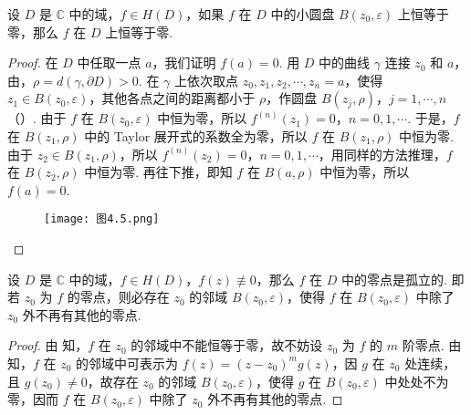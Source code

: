 \documentclass[../../main.tex]{subfiles}
\begin{document}
\begin{proposition}\label{proposition:命题4.3.5}
设 \( D \) 是 \( \mathbb{C} \) 中的域，\( f \in H(D) \)，如果 \( f \) 在 \( D \) 中的小圆盘 \( B(z_0, \varepsilon) \) 上恒等于零，那么 \( f \) 在 \( D \) 上恒等于零.
\end{proposition}
\begin{proof}
在 \( D \) 中任取一点 \( a \)，我们证明 \( f(a) = 0 \). 用 \( D \) 中的曲线 \( \gamma \) 连接 \( z_0 \) 和 \( a \)，由，\( \rho = d(\gamma, \partial D) > 0 \). 在 \( \gamma \) 上依次取点 \( z_0, z_1, z_2, \cdots, z_n = a \)，使得 \( z_1 \in B(z_0, \varepsilon) \)，其他各点之间的距离都小于 \( \rho \)，作圆盘 \( B(z_j, \rho) \)，\( j = 1, \cdots, n \)（）. 由于 \( f \) 在 \( B(z_0, \varepsilon) \) 中恒为零，所以 \( f^{(n)}(z_1) = 0 \)，\( n = 0, 1, \cdots \). 于是，\( f \) 在 \( B(z_1, \rho) \) 中的 Taylor 展开式的系数全为零，所以 \( f \) 在 \( B(z_1, \rho) \) 中恒为零. 由于 \( z_2 \in B(z_1, \rho) \)，所以 \( f^{(n)}(z_2) = 0 \)，\( n = 0, 1, \cdots \)，用同样的方法推理，\( f \) 在 \( B(z_2, \rho) \) 中恒为零. 再往下推，即知 \( f \) 在 \( B(a, \rho) \) 中恒为零，所以 \( f(a) = 0 \).
\begin{figure}[H]
\centering
\texttt{[image: 图4.5.png]}
\caption{}
\label{figure:图4.5}
\end{figure}

\end{proof}

\begin{proposition}\label{proposition:命题4.3.6}
设 \( D \) 是 \( \mathbb{C} \) 中的域，\( f \in H(D) \)，\( f(z) \not\equiv 0 \)，那么 \( f \) 在 \( D \) 中的零点是孤立的. 即若 \( z_0 \) 为 \( f \) 的零点，则必存在 \( z_0 \) 的邻域 \( B(z_0, \varepsilon) \)，使得 \( f \) 在 \( B(z_0, \varepsilon) \) 中除了 \( z_0 \) 外不再有其他的零点.
\end{proposition}
\begin{proof}
由 知，\( f \) 在 \( z_0 \) 的邻域中不能恒等于零，故不妨设 \( z_0 \) 为 \( f \) 的 \( m \) 阶零点. 由知，\( f \) 在 \( z_0 \) 的邻域中可表示为 \( f(z) = (z - z_0)^m g(z) \)，因 \( g \) 在 \( z_0 \) 处连续，且 \( g(z_0) \neq 0 \)，故存在 \( z_0 \) 的邻域 \( B(z_0, \varepsilon) \)，使得 \( g \) 在 \( B(z_0, \varepsilon) \) 中处处不为零，因而 \( f \) 在 \( B(z_0, \varepsilon) \) 中除了 \( z_0 \) 外不再有其他的零点.

\end{proof} 
\end{document}
